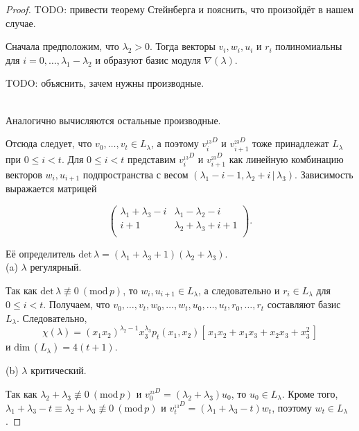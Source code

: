 \begin{proof}

TODO: привести теорему Стейнберга и пояснить, что произойдёт в нашем случае.

Сначала предположим, что $\lambda_2 > 0$. Тогда векторы $v_i, w_i, u_i \mbox{ и } r_i$ полиномиальны для $i = 0, \ldots, \lambda_1 - \lambda_2$ и образуют базис модуля $\nabla (\lambda)$.

TODO: объяснить, зачем нужны производные.


\\

Аналогично вычисляются остальные производные.



Отсюда следует, что $ v_0, \ldots, v_t \in L_{\lambda} $, а поэтому $ v_i^{_{13}D} $ и $ v_{i + 1}^{_{23}D} $ тоже принадлежат $ L_{\lambda} $ при $ 0 \leq i < t $. Для $ 0 \leq i < t $ представим $ v_i^{_{13}D} $ и $ v_{i + 1}^{_{23}D} $ как линейную комбинацию векторов $ w_i, u_{i + 1} $ подпространства с весом $ (\lambda_1 - i - 1, \lambda_2 + i \,|\, \lambda_3) $. Зависимость выражается матрицей 

$$
\begin{pmatrix}
\lambda_1 + \lambda_3 - i & \lambda_1 - \lambda_2 - i \\
i + 1 & \lambda_2 + \lambda_3 + i + 1 \\
\end{pmatrix}
.$$

Её определитель $ \mbox{det}\, \lambda = (\lambda_1 + \lambda_3 + 1) (\lambda_2 + \lambda_3) $.
\\

(a) $\lambda$ регулярный.

Так как $ \mbox{det}\, \lambda \not\equiv 0 ~(\mbox{mod}\,p) $, то $ w_i, u_{i + 1} \in L_{\lambda} $, а следовательно и $ r_i \in L_{\lambda} $ для $ 0 \leq i < t $.
Получаем, что $ v_0, \ldots, v_t, w_0, \ldots, w_t, u_0, \ldots, u_t, r_0, \ldots, r_t $ составляют базис $ L_{\lambda} $. Следовательно,
$$ \chi(\lambda) = (x_1 x_2)^{\lambda_2 - 1} x_3^{\lambda_3} p_t (x_1, x_2) [\,x_1 x_2 + x_1 x_3 + x_2 x_3 + x_3^2\,] $$
и $ \mbox{dim}\,(L_{\lambda}) = 4 (t + 1). $

(b) $\lambda$ критический.

Так как $ \lambda_2 + \lambda_3 \not\equiv 0 ~(\mbox{mod}\,p) $ и $ v_0^{_{23}D} = (\lambda_2 + \lambda_3) u_0 $, то $ u_0 \in L_{\lambda}. $ Кроме того, $ \lambda_1 + \lambda_3 - t \equiv \lambda_2 + \lambda_3 \not\equiv 0 ~(\mbox{mod}\,p) $ и $ v_t^{_{13}D} = (\lambda_1 + \lambda_3 - t) w_t $, поэтому $ w_t \in L_{\lambda} $.


\end{proof}
